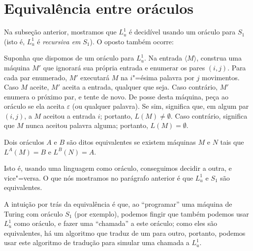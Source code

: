\section{Equivalência entre oráculos}

Na subseção anterior,
mostramos que $L_u^1$ é decidível usando um oráculo para $S_1$
(isto é, $L_u^1$ é \emph{recursiva em} $S_1$).
O oposto também ocorre:

Suponha que dispomos de um oráculo para $L_u^1$.
Na entrada $\langle M \rangle$,
construa uma máquina $M'$ que ignorará sua própria entrada
e enumerar os pares $(i, j)$.
Para cada par enumerado,
$M'$ executará $M$ na $i$"=ésima palavra por $j$ movimentos.
Caso $M$ aceite, $M'$ aceita a entrada, qualquer que seja.
Caso contrário, $M'$ enumera o próximo par, e tente de novo.
De posse desta máquina, peça ao oráculo se ela aceita $\varepsilon$
(ou qualquer palavra).
Se sim, significa que, em algum par $(i, j)$,
a $M$ aceitou a entrada $i$; portanto, $L(M) \neq \emptyset$.
Caso contrário, significa que $M$ nunca aceitou palavra alguma;
portanto, $L(M) = \emptyset$.

\begin{definition}
    Dois oráculos $A$ e $B$ são ditos equivalentes
    se existem máquinas $M$ e $N$ tais que
    $L^A(M) = B$ e $L^B(N) = A$.
\end{definition}

Isto é, usando uma linguagem como oráculo, conseguimos decidir a outra,
e vice"=versa.
O que nós mostramos no parágrafo anterior é que
$L_u^1$ e $S_1$ são equivalentes.

A intuição por trás da equivalência é que,
ao ``programar'' uma máquina de Turing com oráculo $S_1$ (por exemplo),
podemos fingir que também podemos usar $L_u^1$ como oráculo,
e fazer uma ``chamada'' a este oráculo;
como eles são equivalentes,
há um algoritmo que traduz de um para outro,
portanto, podemos usar este algoritmo de tradução
para simular uma chamada a $L_u^1$.
